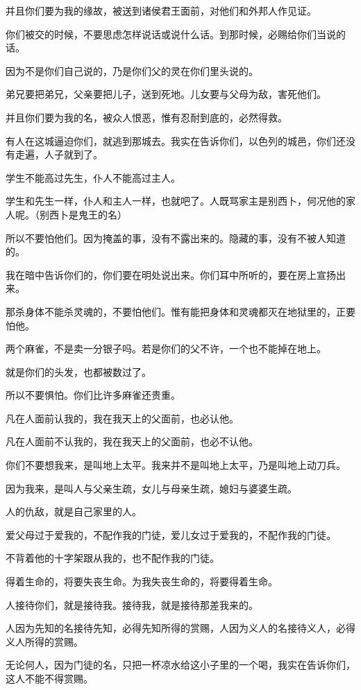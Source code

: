 \documentclass[12pt,oneside]{book}
\begin{document}
并且你们要为我的缘故，被送到诸侯君王面前，对他们和外邦人作见证。

你们被交的时候，不要思虑怎样说话或说什么话。到那时候，必赐给你们当说的话。

因为不是你们自己说的，乃是你们父的灵在你们里头说的。

弟兄要把弟兄，父亲要把儿子，送到死地。儿女要与父母为敌，害死他们。

并且你们要为我的名，被众人恨恶，惟有忍耐到底的，必然得救。

有人在这城逼迫你们，就逃到那城去。我实在告诉你们，以色列的城邑，你们还没有走遍，人子就到了。

学生不能高过先生，仆人不能高过主人。

学生和先生一样，仆人和主人一样，也就吧了。人既骂家主是别西卜，何况他的家人呢。（别西卜是鬼王的名）

所以不要怕他们。因为掩盖的事，没有不露出来的。隐藏的事，没有不被人知道的。

我在暗中告诉你们的，你们要在明处说出来。你们耳中所听的，要在房上宣扬出来。

那杀身体不能杀灵魂的，不要怕他们。惟有能把身体和灵魂都灭在地狱里的，正要怕他。

两个麻雀，不是卖一分银子吗。若是你们的父不许，一个也不能掉在地上。

就是你们的头发，也都被数过了。

所以不要惧怕。你们比许多麻雀还贵重。

凡在人面前认我的，我在我天上的父面前，也必认他。

凡在人面前不认我的，我在我天上的父面前，也必不认他。

你们不要想我来，是叫地上太平。我来并不是叫地上太平，乃是叫地上动刀兵。

因为我来，是叫人与父亲生疏，女儿与母亲生疏，媳妇与婆婆生疏。

人的仇敌，就是自己家里的人。

爱父母过于爱我的，不配作我的门徒，爱儿女过于爱我的，不配作我的门徒。

不背着他的十字架跟从我的，也不配作我的门徒。

得着生命的，将要失丧生命。为我失丧生命的，将要得着生命。

人接待你们，就是接待我。接待我，就是接待那差我来的。

人因为先知的名接待先知，必得先知所得的赏赐，人因为义人的名接待义人，必得义人所得的赏赐。

无论何人，因为门徒的名，只把一杯凉水给这小子里的一个喝，我实在告诉你们，这人不能不得赏赐。
\end{document}
